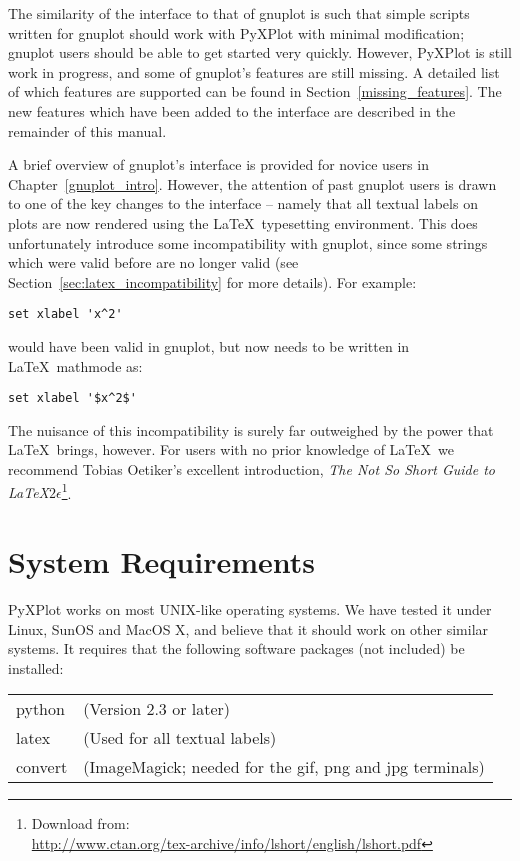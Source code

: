 The similarity of the interface to that of gnuplot is such that simple scripts
written for gnuplot should work with PyXPlot with minimal modification; gnuplot
users should be able to get started very quickly.  However, PyXPlot is still
work in progress, and some of gnuplot's features are still missing.  A detailed
list of which features are supported can be found in
Section~\ref{missing_features}. The new features which have been added to the
interface are described in the remainder of this manual.

A brief overview of gnuplot's interface is provided for novice users in
Chapter~\ref{gnuplot_intro}. However, the attention of past gnuplot users is
drawn to one of the key changes to the interface -- namely that all textual
labels on plots are now rendered using the \LaTeX\ typesetting environment. This
does unfortunately introduce some incompatibility with gnuplot, since some
strings which were valid before are no longer valid (see
Section~\ref{sec:latex_incompatibility} for more details). For example:

\dontdo
\begin{verbatim}set xlabel 'x^2'\end{verbatim}

\noindent would have been valid in gnuplot, but now needs to be written in
\LaTeX\ mathmode as:

\dodo
\begin{verbatim}set xlabel '$x^2$'\end{verbatim}

\noindent The nuisance of this incompatibility is surely far outweighed by the
power that \LaTeX\ brings, however. For users with no prior knowledge of
\LaTeX\ we recommend Tobias Oetiker's excellent introduction, \textit{The Not
So Short Guide to \LaTeX $2\epsilon$}\footnote{Download from:\\
\url{http://www.ctan.org/tex-archive/info/lshort/english/lshort.pdf}}.

\section{System Requirements}

PyXPlot works on most UNIX-like operating systems. We have tested it under
Linux, SunOS and MacOS X, and believe that it should work on other similar
systems. It requires that the following software packages (not included) be
installed:

\vspace{0.5cm}
\begin{tabular}{ll}
python  & (Version 2.3 or later) \\
latex   & (Used for all textual labels) \\
convert & (ImageMagick; needed for the gif, png and jpg terminals) \\
\end{tabular}
\vspace{0.5cm}

